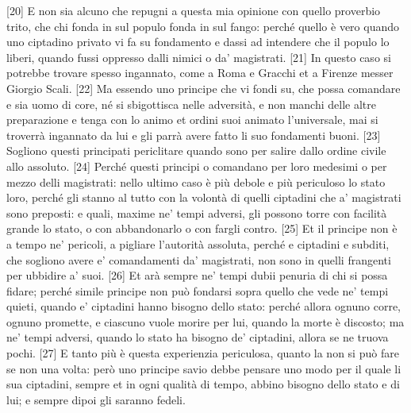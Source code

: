 {[}20{]}
E non sia alcuno che repugni a questa mia opinione con quello proverbio
trito, che chi fonda in sul populo fonda in sul fango: perché quello è
vero quando uno ciptadino privato vi fa su fondamento e dassi ad
intendere che il populo lo liberi, quando fussi oppresso dalli nimici o
da' magistrati. {[}21{]} In questo caso si potrebbe trovare spesso
ingannato, come a Roma e Gracchi et a Firenze messer Giorgio Scali.
{[}22{]} Ma essendo uno principe che vi fondi su, che possa comandare e
sia uomo di core, né si sbigottisca nelle adversità, e non manchi delle
altre preparazione e tenga con lo animo et ordini suoi animato
l'universale, mai si troverrà ingannato da lui e gli parrà avere fatto
li suo fondamenti buoni. {[}23{]} Sogliono questi principati periclitare
quando sono per salire dallo ordine civile allo assoluto. {[}24{]}
Perché questi principi o comandano per loro medesimi o per mezzo delli
magistrati: nello ultimo caso è più debole e più periculoso lo stato
loro, perché gli stanno al tutto con la volontà di quelli ciptadini che
a' magistrati sono preposti: e quali, maxime ne' tempi adversi, gli
possono torre con facilità grande lo stato, o con abbandonarlo o con
fargli contro. {[}25{]} Et il principe non è a tempo ne' pericoli, a
pigliare l'autorità assoluta, perché e ciptadini e subditi, che sogliono
avere e' comandamenti da' magistrati, non sono in quelli frangenti per
ubbidire a' suoi. {[}26{]} Et arà sempre ne' tempi dubii penuria di chi
si possa fidare; perché simile principe non può fondarsi sopra quello
che vede ne' tempi quieti, quando e' ciptadini hanno bisogno dello
stato: perché allora ognuno corre, ognuno promette, e ciascuno vuole
morire per lui, quando la morte è discosto; ma ne' tempi adversi, quando
lo stato ha bisogno de' ciptadini, allora se ne truova pochi. {[}27{]} E
tanto più è questa experienzia periculosa, quanto la non si può fare se
non una volta: però uno principe savio debbe pensare uno modo per il
quale li sua ciptadini, sempre et in ogni qualità di tempo, abbino
bisogno dello stato e di lui; e sempre dipoi gli saranno fedeli.


